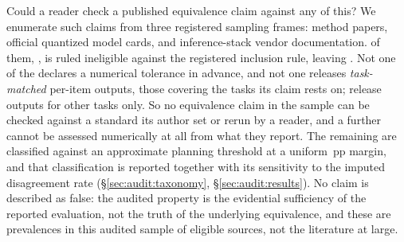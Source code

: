 Could a reader check a published equivalence claim against any of this? We
enumerate \AuditFrozenCandidates{} such claims from three
registered sampling frames: method papers, official quantized model cards, and
inference-stack vendor documentation. \AuditIneligible{} of them,
\AuditIneligibleClaim{}, is ruled ineligible against the registered inclusion
rule, leaving \AuditEligible{}. Not one of the \AuditEligible{} declares a
numerical tolerance in advance, and not one releases \emph{task-matched}
per-item outputs, those covering the tasks its claim rests on;
\AuditPerItemOtherTaskOnly{} release outputs for other tasks only. So no
equivalence claim in the sample can be checked against a standard its author set
or rerun by a reader, and a further \AuditNotAssessable{} cannot be assessed
numerically at all from what they report. The remaining \AuditAssessable{} are
classified against an approximate planning threshold at a uniform
\AuditMarginPP{}\,pp margin, and that classification is reported together with
its sensitivity to the imputed disagreement rate (\S\ref{sec:audit:taxonomy},
\S\ref{sec:audit:results}). No claim is described as false: the audited property
is the evidential sufficiency of the reported evaluation, not the truth of the
underlying equivalence, and these are prevalences in this audited sample of
\AuditEligible{} eligible sources, not the literature at large.

